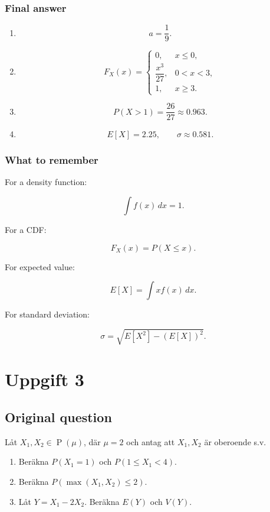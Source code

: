 \documentclass[10pt]{article}
\begin{document}
\subsubsection*{Final answer}
\begin{enumerate}[label=\alph*)]
\item
\[
a=\frac{1}{9}.
\]

\item
\[
F_X(x)=
\begin{cases}
0,
& x\leq 0,\\
\dfrac{x^3}{27},
& 0<x<3,\\
1,
& x\geq 3.
\end{cases}
\]

\item
\[
P(X>1)=\frac{26}{27}\approx 0.963.
\]

\item
\[
E[X]=2.25,
\qquad
\sigma\approx 0.581.
\]
\end{enumerate}

\subsubsection*{What to remember}
For a density function:

\[
\int f(x)\,dx=1.
\]

For a CDF:

\[
F_X(x)=P(X\leq x).
\]

For expected value:

\[
E[X]=\int x f(x)\,dx.
\]

For standard deviation:

\[
\sigma=
\sqrt{E[X^2]-(E[X])^2}.
\]

\section*{Uppgift 3}

\subsection*{Original question}
Låt $X_1,X_2\in \operatorname{P}(\mu)$, där $\mu=2$ och antag att
$X_1,X_2$ är oberoende s.v.

\begin{enumerate}[label=\alph*)]
\item
Beräkna $P(X_1=1)$ och $P(1\leq X_1<4)$.

\item
Beräkna $P(\max(X_1,X_2)\leq 2)$.

\item
Låt $Y=X_1-2X_2$. Beräkna $E(Y)$ och $V(Y)$.
\end{enumerate}
\end{document}
